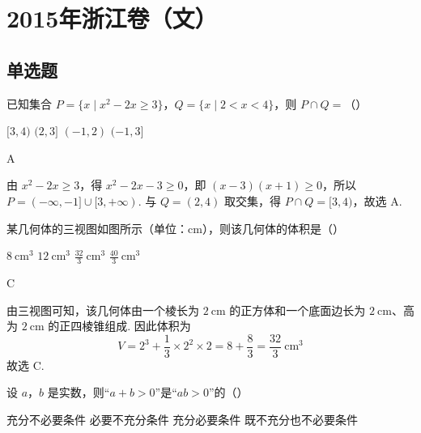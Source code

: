 \chapter{2015年浙江卷（文）}

\section{单选题}

\begin{problem}
已知集合 \(P=\{x\mid x^2-2x\geqslant3\}\)，\(Q=\{x\mid 2<x<4\}\)，则 \(P\cap Q=\)（\quad）

\choices
    {\([3,4)\)}
    {\((2,3]\)}
    {\((-1,2)\)}
    {\((-1,3]\)}
\end{problem}

\begin{answer}
A
\end{answer}

\begin{solution}
由 \(x^2-2x\geqslant3\)，得 \(x^2-2x-3\geqslant0\)，即 \((x-3)(x+1)\geqslant0\)，所以 \(P=(-\infty,-1]\cup[3,+\infty)\). 与 \(Q=(2,4)\) 取交集，得 \(P\cap Q=[3,4)\)，故选 A.
\end{solution}

\begin{problem}
某几何体的三视图如图所示（单位：\(\mathrm{cm}\)），则该几何体的体积是（\quad）


\choices
    {\(8\mathrm{~cm}^3\)}
    {\(12\mathrm{~cm}^3\)}
    {\(\frac{32}{3}\mathrm{~cm}^3\)}
    {\(\frac{40}{3}\mathrm{~cm}^3\)}
\end{problem}

\begin{answer}
C
\end{answer}

\begin{solution}
由三视图可知，该几何体由一个棱长为 \(2\mathrm{~cm}\) 的正方体和一个底面边长为 \(2\mathrm{~cm}\)、高为 \(2\mathrm{~cm}\) 的正四棱锥组成. 因此体积为
\[
V=2^3+\frac{1}{3}\times2^2\times2=8+\frac{8}{3}=\frac{32}{3}\mathrm{~cm}^3
\]
故选 C.
\end{solution}

\begin{problem}
设 \(a\)，\(b\) 是实数，则“\(a+b>0\)”是“\(ab>0\)”的（\quad）

\choices
    {充分不必要条件}
    {必要不充分条件}
    {充分必要条件}
    {既不充分也不必要条件}
\end{problem}

